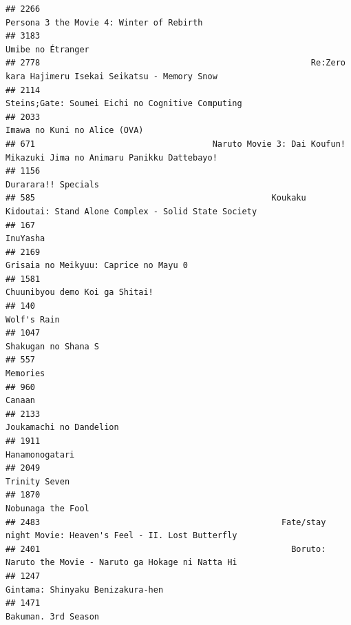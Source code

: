 \documentclass[
]{article}
\begin{document}
\begin{verbatim}
## 2266                                                                  Persona 3 the Movie 4: Winter of Rebirth
## 3183                                                                                         Umibe no Étranger
## 2778                                                       Re:Zero kara Hajimeru Isekai Seikatsu - Memory Snow
## 2114                                                          Steins;Gate: Soumei Eichi no Cognitive Computing
## 2033                                                                              Imawa no Kuni no Alice (OVA)
## 671                                    Naruto Movie 3: Dai Koufun! Mikazuki Jima no Animaru Panikku Dattebayo!
## 1156                                                                                       Durarara!! Specials
## 585                                                Koukaku Kidoutai: Stand Alone Complex - Solid State Society
## 167                                                                                                   InuYasha
## 2169                                                                     Grisaia no Meikyuu: Caprice no Mayu 0
## 1581                                                                            Chuunibyou demo Koi ga Shitai!
## 140                                                                                                Wolf's Rain
## 1047                                                                                       Shakugan no Shana S
## 557                                                                                                   Memories
## 960                                                                                                     Canaan
## 2133                                                                                   Joukamachi no Dandelion
## 1911                                                                                            Hanamonogatari
## 2049                                                                                             Trinity Seven
## 1870                                                                                         Nobunaga the Fool
## 2483                                                 Fate/stay night Movie: Heaven's Feel - II. Lost Butterfly
## 2401                                                   Boruto: Naruto the Movie - Naruto ga Hokage ni Natta Hi
## 1247                                                                          Gintama: Shinyaku Benizakura-hen
## 1471                                                                                       Bakuman. 3rd Season

\end{verbatim}
\end{document}
